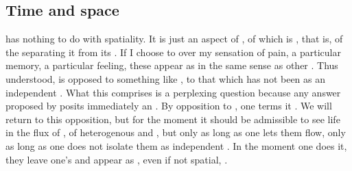 


\subsection{Time and space}\label{sub:timeSpace}
%
\pa {} has nothing to do with spatiality. It is
just an aspect of , of  which is
, that is,  of the  separating it from its
. If I choose to  over my sensation of pain, a particular
memory, a particular feeling, these appear as  in the same sense as
other . Thus understood,  is opposed to something
like , to that which has not been  as an
independent . What this  comprises is a perplexing
question because any answer proposed by  posits immediately an
.  By opposition to , one terms it
. We will return to this opposition, but for the moment it
should be admissible to see  life in the flux of , of
heterogenous  and , but only as long as one
lets them flow, only as long as one does not isolate them as independent
.  In the moment one does it, they leave one's  and
appear as , even if not spatial, .

